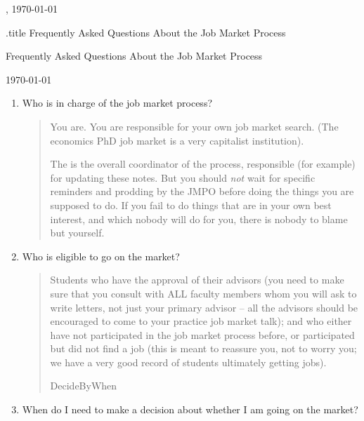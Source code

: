 \documentclass{\classes/econtex}
\providecommand\phantomsection{}
\begin{document}
\hfill{\tiny \jobname, \today} \vspace{.1in}

\begin{verbatimwrite}{\jobname.title}
  Frequently Asked Questions About the Job Market Process
\end{verbatimwrite}

\centerline{\Large Frequently Asked Questions About the Job Market Process}\medskip\medskip

\centerline{\today}\medskip\medskip

\ifdvi\large\fi

\begin{enumerate}

\item Who is in charge of the job market process?
  \begin{quote}
    You are.  You are responsible for your own job market search.  (The economics PhD job market is a very capitalist institution).

    The \JMPO is the overall coordinator of the process, responsible (for example) for updating these notes.  But you should \textit{not} wait for specific reminders and prodding by the JMPO before doing the things you are supposed to do. If you fail to do things that are in your own best interest, and which nobody will do for you, there is nobody to blame but yourself.

  \end{quote}

\item  Who is eligible to go on the market?
  \begin{quote}  
    Students who have the approval of their advisors (you need to make
    sure that you consult with ALL faculty members whom you will ask to
    write letters, not just your primary advisor -- all the advisors
    should be encouraged to come to your practice job market talk); and
    who either have not participated in the job market process before,
    or participated but did not find a job (this is meant to reassure
    you, not to worry you; we have a very good record of students
    ultimately getting jobs).

    \ifdvi\phantomsection\hypertarget{DecideByWhen}{DecideByWhen}\fi
    
  \end{quote}

\item  When do I need to make a decision about whether I am going on
  the market?


\end{enumerate}
\end{document}
